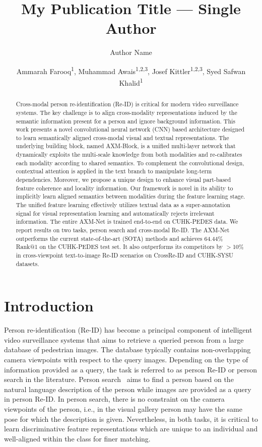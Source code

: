 \documentclass[letterpaper]{article} \usepackage{aaai22}  \usepackage{times}  \usepackage{helvet}  \usepackage{courier}  \usepackage[hyphens]{url}  \usepackage{graphicx} \urlstyle{rm} \def\UrlFont{\rm}  \usepackage{natbib}  \usepackage{caption} \DeclareCaptionStyle{ruled}{labelfont=normalfont,labelsep=colon,strut=off} \frenchspacing  \setlength{\pdfpagewidth}{8.5in}  \setlength{\pdfpageheight}{11in}  \usepackage{algorithm}
\title{\centering{AXM-Net: Implicit Cross-Modal Feature Alignment for Person Re-identification}}
\title{My Publication Title --- Single Author}
\author {
    Author Name
}
\author {
Ammarah Farooq\textsuperscript{\rm 1},
    Muhammad Awais\textsuperscript{\rm 1,2,3},
    Josef Kittler\textsuperscript{\rm 1,2,3},
    Syed Safwan Khalid\textsuperscript{\rm 1} 
}
\begin{document}
\maketitle

\begin{abstract}
Cross-modal person re-identification (Re-ID) is critical for modern video surveillance systems. The key challenge is to align cross-modality representations induced by the semantic information present for a person and ignore background information. This work presents a novel convolutional neural network (CNN) based architecture designed to learn semantically aligned cross-modal visual and textual representations. The underlying building block, named AXM-Block, is a unified multi-layer network that dynamically exploits the multi-scale knowledge from both modalities and re-calibrates each modality according to shared semantics. To complement the convolutional design, contextual attention is applied in the text branch to manipulate long-term dependencies. Moreover, we propose a unique design to enhance visual part-based feature coherence and locality information. Our framework is novel in its ability to implicitly learn aligned semantics between modalities during the feature learning stage. The unified feature learning effectively utilizes textual data as a super-annotation signal for visual representation learning and automatically rejects irrelevant information. The entire AXM-Net is trained end-to-end on CUHK-PEDES data. We report results on two tasks, person search and cross-modal Re-ID. The AXM-Net outperforms the current state-of-the-art (SOTA) methods and achieves 64.44\% Rank@1 on the CUHK-PEDES test set. It also outperforms its competitors by $>$10\% in cross-viewpoint text-to-image Re-ID scenarios on CrossRe-ID and CUHK-SYSU datasets.
\end{abstract}

\section{Introduction}
Person re-identification (Re-ID) has become a principal component of intelligent video surveillance systems that aims to retrieve a queried person from a large database of pedestrian images. The database typically contains non-overlapping camera viewpoints with respect to the query images. Depending on the type of information provided as a query, the task is referred to as person Re-ID or person search in the literature. Person search~\cite{li2017person} aims to find a person based on the natural language description of the person while images are provided as a query in person Re-ID. In person search, there is no constraint on the camera viewpoints of the person, i.e., in the visual gallery person may have the same pose for which the description is given. Nevertheless, in both tasks, it is critical to learn discriminative feature representations which are unique to an individual and well-aligned within the class for finer matching.  
 
\end{document}
